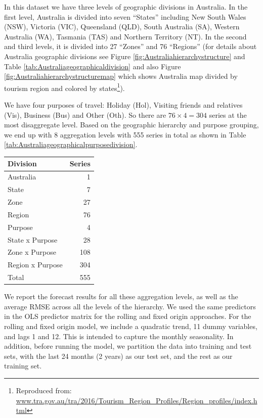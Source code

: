 \documentclass[11pt,a4paper,]{article}
\let\origtable\table
\let\endorigtable\endtable
\renewenvironment{table}[1][2] {
    \expandafter\origtable\expandafter[!htbp]
} {
    \endorigtable
}
\begin{document}
In this dataset we have three levels of geographic divisions in Australia. In the first level, Australia is divided into seven ``States'' including New South Wales (NSW), Victoria (VIC), Queensland (QLD), South Australia (SA), Western Australia (WA), Tasmania (TAS) and Northern Territory (NT). In the second and third levels, it is divided into 27 ``Zones'' and 76 ``Regions'' (for details about Australia geographic divisions see Figure \ref{fig:Australiahierarchystructure} and Table \ref{tab:Australiageographicaldivision} and also Figure \ref{fig:Australiahierarchystructuremap} which shows Australia map divided by tourism region and colored by states\footnote{Reproduced from: \url{www.tra.gov.au/tra/2016/Tourism_Region_Profiles/Region_profiles/index.html}}).

We have four purposes of travel: Holiday (Hol), Visiting friends and relatives (Vis), Business (Bus) and Other (Oth). So there are \(76\times4 = 304\) series at the most disaggregate level. Based on the geographic hierarchy and purpose grouping, we end up with 8 aggregation levels with 555 series in total as shown in Table \ref{tab:Australiageographicalpurposedivision}.

\begin{table}[!h]

\caption{\label{tab:Australiageographicalpurposedivision}Number of Australian domestic tourism series at each aggregation level.}
\centering
\begin{tabular}[t]{lr}
\toprule
Division & Series\\
\midrule
Australia & 1\\
State & 7\\
Zone & 27\\
Region & 76\\
Purpose & 4\\
State x Purpose & 28\\
Zone x Purpose & 108\\
Region x Purpose & 304\\
\hline
Total & 555\\
\bottomrule
\end{tabular}
\end{table}

We report the forecast results for all these aggregation levels, as well as the average RMSE across all the levels of the hierarchy. We used the same predictors in the OLS predictor
matrix for the rolling and fixed origin approaches. For the rolling and fixed origin model, we include a quadratic trend, 11 dummy variables, and lags 1 and 12. This is intended to capture the monthly seasonality. In addition, before running the model, we partition the data into training and test sets, with the last 24 months (2 years) as our test set, and the rest as our training set.
\end{document}
